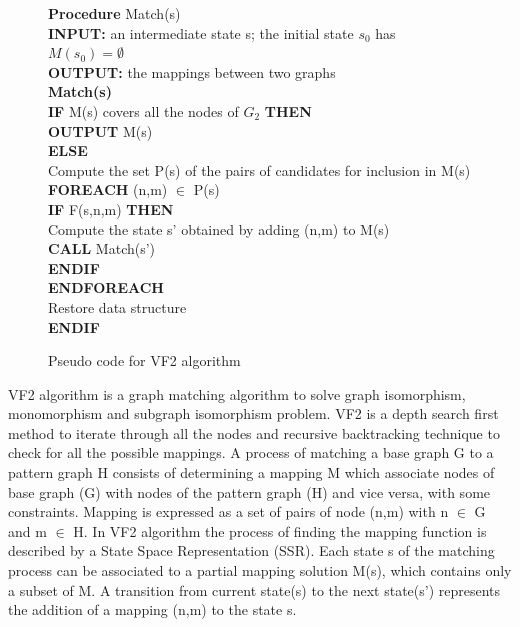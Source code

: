 \begin{figure}

\begin{algorithm}[H]
\begin{algorithmic}
 \LState  \textbf{Procedure} Match(s)\\
\textbf{INPUT:}  an intermediate state s; the initial state $s_0$ has $M(s_0)=\emptyset$\\
\textbf{OUTPUT:} the mappings between two graphs\\
\textbf{Match(s)}\\
 \textbf{IF} M(s) covers all the nodes of $G_2$ \textbf{THEN}\\
\quad \textbf{OUTPUT} M(s)\\
\textbf{ELSE}\\
 \quad    Compute the set P(s) of the pairs of candidates for inclusion in M(s)\\
\quad\textbf{FOREACH} (n,m) $\in$ P(s)\\
\quad\quad\textbf{IF} F(s,n,m) \textbf{THEN}\\
\quad\quad\quad	Compute the state s' obtained by adding (n,m) to M(s)\\
\quad\quad\quad\textbf{CALL} Match(s')\\
\quad\quad\textbf{ENDIF}\\
\quad\textbf{ENDFOREACH}\\
\quad Restore data structure\\
\textbf{ENDIF}\\

\end{algorithmic}
\end{algorithm}
\caption{Pseudo code for VF2 algorithm}
\label{fig:VF2}
\end{figure}


VF2 algorithm is a graph matching algorithm to solve graph isomorphism, monomorphism and  subgraph isomorphism problem. VF2 is a depth search first method to iterate through all the nodes and recursive backtracking technique to check for all the possible mappings. A process of matching 
a base graph G to a pattern graph H consists of determining a mapping M which associate nodes of base graph (G) with nodes of the pattern graph (H) and vice versa, with some constraints.
Mapping is expressed as a set of pairs of node (n,m) with n $\in$ G and m $\in$ H. 
In VF2 algorithm the process of finding the mapping function is described by a  State Space Representation (SSR). Each state s of the matching process can be associated to a partial mapping solution M(s),
which contains only a subset of M. A transition from current state(s) to the next state(s') represents the addition of a mapping (n,m) to the state s.

